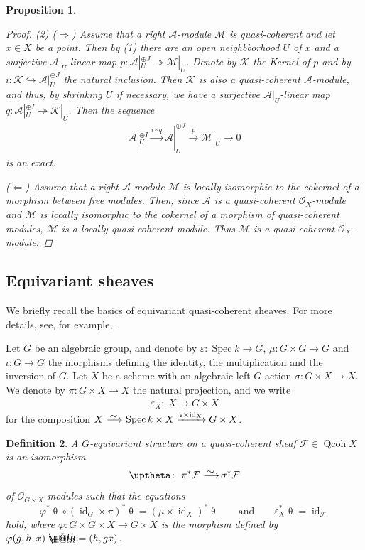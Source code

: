 \documentclass[10pt,a4paper]{amsart}
\makeatletter
\newtheorem{dfn}{Definition}[section]
\newtheorem{prop}[dfn]{Proposition}
\newcommand*{\defeq}{\mathrel{\rlap{%
 \raisebox{0.3ex}{$\m@th\cdot$}}%
 \raisebox{-0.3ex}{$\m@th\cdot$}}%
 =}
\numberwithin{equation}{section}
\newcommand{\Spec}{\operatorname{Spec}}
\newcommand{\Qcoh}{\operatorname{Qcoh}}
\newcommand{\id}{\operatorname{id}}
\newcommand{\cA}{\mathcal{A}}
\newcommand{\cF}{\mathcal{F}}
\newcommand{\cK}{\mathcal{K}}
\newcommand{\cM}{\mathcal{M}}
\newcommand{\cO}{\mathcal{O}}
\newcommand{\simto}{\,\,\,\,\raisebox{4pt}{$\sim$}{\kern -1.1em \longrightarrow}\,}
\newcommand{\hookto}{\hookrightarrow}
\newcommand{\surjto}{\twoheadrightarrow}
\makeatother
\begin{document}
\begin{prop}
\begin{proof}
 (2) ($\Rightarrow$) Assume that a right $\cA$-module $\cM$ is quasi-coherent and let $x\in X$ be a point. Then by (1) there are an open neighbborhood $U$ of $x$ and a surjective $\cA|_U$-linear map $p \colon \cA|_U^{\oplus J}\surjto \cM|_U$. Denote by $\cK$ the Kernel of $p$ and by $i\colon \cK\hookto \cA|_U^{\oplus J}$ the natural inclusion. Then $\cK$ is also a quasi-coherent $\cA$-module, and thus, by shrinking $U$ if necessary, we have a surjective $\cA|_U$-linear map $q \colon \cA|_U^{\oplus I}\surjto \cK|_U$. Then the sequence
 \begin{gather*}
 \cA|_U^{\oplus I}\xrightarrow{i \circ q}\cA|_U^{\oplus J}\xrightarrow{p}\cM|_U\to 0
 \end{gather*}
is an exact.

($\Leftarrow$) Assume that a right $\cA$-module $\cM$ is locally isomorphic to the cokernel of a morphism between free modules. Then, since $\cA$ is a quasi-coherent $\cO_X$-module and $\cM$ is locally isomorphic to the cokernel of a morphism of quasi-coherent modules, $\cM$ is a locally quasi-coherent module. Thus $\cM$ is a quasi-coherent $\cO_X$-module.
 \end{proof}
\end{prop}

\subsection{Equivariant sheaves}\label{equiv section}
We briefly recall the basics of equivariant quasi-coherent sheaves. For more details, see, for example,~\cite[Section~2]{bfk}.

Let $G$ be an algebraic group, and denote by $\varepsilon\colon \Spec k\to G$, $\mu\colon G\times G\to G$ and $\iota\colon G\to G$ the morphisms defining the identity, the multiplication and the inversion of $G$.
Let $X$ be a scheme with an algebraic left $G$-action $\sigma\colon G\times X \to X$. We denote by $\pi\colon G\times X\to X$ the natural projection, and we write
\begin{gather*}
\varepsilon_X\colon\ X\to G\times X
\end{gather*}
for the composition $X\simto \Spec k\times X\xrightarrow{ \varepsilon\times \id_X}G\times X$. \begin{dfn}
A {\it $G$-equivariant structure} on a quasi-coherent sheaf $\cF\in \Qcoh X$ is an isomorphism
\begin{gather*}
\uptheta\colon\ \pi^*\cF\simto \sigma^*\cF
\end{gather*}
of $\cO_{G\times X}$-modules such that the equations
\begin{equation}\label{compati}
\varphi^*\uptheta\circ (\id_G\times\pi)^*\uptheta=(\mu\times\id_X )^*\uptheta \qquad\text{and}\qquad
\varepsilon_X^*\uptheta=\id_{\cF}
\end{equation}
hold, where $\varphi\colon G\times G\times X\to G\times X$ is the morphism defined by $\varphi(g,h,x)\defeq(h,gx)$.
\end{dfn}
\end{document}
